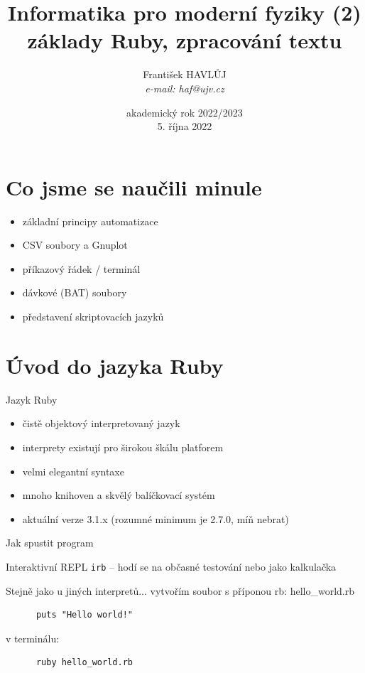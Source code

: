 \documentclass{beamer}
\title[IMF (2)]{Informatika pro moderní fyziky (2)\\základy Ruby, zpracování textu}
\author[Franti\v{s}ek HAVL\r{U}J, ORF ÚJV Řež]{Franti\v{s}ek HAVL\r{U}J\\{\scriptsize \emph{e-mail: haf@ujv.cz}}}
\date{akademický rok 2022/2023\\5. října 2022}
\institute[ORF ÚJV Řež]
{ÚJV Řež\\oddělení Reaktorové fyziky a podpory palivového cyklu}
\begin{document}
\begin{frame}
  \titlepage
\end{frame}

\begin{frame}
  \tableofcontents
\end{frame}

\section{Co jsme se naučili minule}

\begin{frame}{}
  \begin{itemize}
    \item základní principy automatizace
    \item CSV soubory a Gnuplot
    \item příkazový řádek / terminál
    \item dávkové (BAT) soubory
    \item představení skriptovacích jazyků
  \end{itemize}
\end{frame}


\section{Úvod do jazyka Ruby}

\begin{frame}{Jazyk Ruby}
  \begin{itemize}
    \item čistě objektový interpretovaný jazyk
    \item interprety existují pro širokou škálu platforem
    \item velmi elegantní syntaxe
    \item mnoho knihoven a skvělý balíčkovací systém
    \item aktuální verze 3.1.x (rozumné minimum je 2.7.0, míň nebrat)
  \end{itemize}
\end{frame}

\begin{frame}[fragile]{Jak spustit program}
  \begin{block}{Interaktivní REPL}
    \texttt{irb} -- hodí se na občasné testování nebo jako kalkulačka
  \end{block}
  \begin{block}{Stejně jako u jiných interpretů...}
    vytvořím soubor s příponou rb: hello\_world.rb
    \begin{verbatim}
      puts "Hello world!"
    \end{verbatim}
    v terminálu:
    \begin{verbatim}
      ruby hello_world.rb
    \end{verbatim}
  \end{block}
\end{frame}
\end{document}
